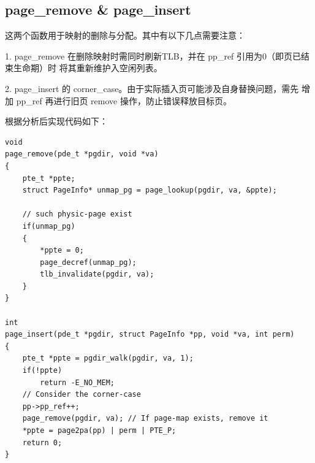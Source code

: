 \documentclass[12pt, letterpaper]{report}
\begin{document}
\subsection{\large page\_remove \& page\_insert}
这两个函数用于映射的删除与分配。其中有以下几点需要注意：\par
1. page\_remove 在删除映射时需同时刷新TLB，并在 pp\_ref 引用为0（即页已结束生命期）时
将其重新维护入空闲列表。\par 
2. page\_insert 的 corner\_case。由于实际插入页可能涉及自身替换问题，需先
增加 pp\_ref 再进行旧页 remove 操作，防止错误释放目标页。\par
\quad \par 
\noindent 根据分析后实现代码如下：\par 
\lstset{style=CStyle}
\setmainfont{Consolas}
\begin{lstlisting}
void
page_remove(pde_t *pgdir, void *va)
{
    pte_t *ppte;
    struct PageInfo* unmap_pg = page_lookup(pgdir, va, &ppte);

    // such physic-page exist
    if(unmap_pg)
    {
        *ppte = 0;
        page_decref(unmap_pg);
        tlb_invalidate(pgdir, va);
    }
}

int
page_insert(pde_t *pgdir, struct PageInfo *pp, void *va, int perm)
{
	pte_t *ppte = pgdir_walk(pgdir, va, 1);
	if(!ppte)
		return -E_NO_MEM;
	// Consider the corner-case
	pp->pp_ref++;
	page_remove(pgdir, va);	// If page-map exists, remove it
	*ppte = page2pa(pp) | perm | PTE_P;
	return 0;
}
\end{lstlisting}
\setmainfont{Times New Roman}

\end{document}

